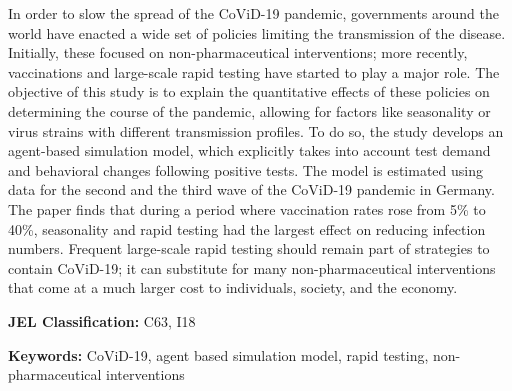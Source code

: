 \noindent
In order to slow the spread of the CoViD-19 pandemic, governments around the world have
enacted a wide set of policies limiting the transmission of the disease. Initially,
these focused on non-pharmaceutical interventions; more recently, vaccinations and
large-scale rapid testing have started to play a major role. The objective of this study
is to explain the quantitative effects of these policies on determining the course of
the pandemic, allowing for factors like seasonality or virus strains with different
transmission profiles. To do so, the study develops an agent-based simulation model,
which explicitly takes into account test demand and behavioral changes following
positive tests. The model is estimated using data for the second and the third wave of
the CoViD-19 pandemic in Germany. The paper finds that during a period where vaccination
rates rose from 5\% to 40\%, seasonality and rapid testing had the largest effect on
reducing infection numbers. Frequent large-scale rapid testing should remain part of
strategies to contain CoViD-19; it can substitute for many non-pharmaceutical
interventions that come at a much larger cost to individuals, society, and the economy.

\vspace{1cm}
\noindent \textbf{JEL Classification:} C63, I18

\noindent \textbf{Keywords:} CoViD-19, agent based simulation model, rapid testing,
non-pharmaceutical interventions